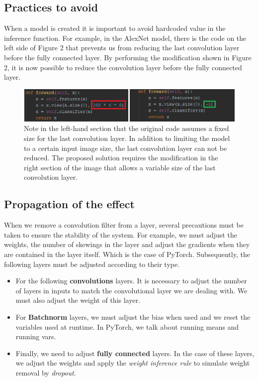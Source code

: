 \documentclass[12pt]{article}
\begin{document}
\subsection{Practices to avoid}

When a model is created it is important to avoid hardcoded value in the inference function. For example, in the AlexNet model, there is the code on the left side of Figure 2 that prevents us from reducing the last convolution layer before the fully connected layer. By performing the modification shown in Figure 2, it is now possible to reduce the convolution layer before the fully connected layer.
\begin{figure}[H]
	\centering
	\includegraphics{fig/mistake}
	\caption{Note in the left-hand section that the original code assumes a fixed size for the last convolution layer. In addition to limiting the model to a certain input image size, the last convolution layer can not be reduced. The proposed solution requires the modification in the right section of the image that allows a variable size of the last convolution layer.}
	\label{fig:mistake}
\end{figure}


\subsection{Propagation of the effect}
When we remove a convolution filter from a layer, several precautions must be taken to ensure the stability of the system. For example, we must adjust the weights, the number of skewings in the layer and adjust the gradients when they are contained in the layer itself. Which is the case of PyTorch.
\newpage
Subsequently, the following layers must be adjusted according to their type.
\begin{itemize}[noitemsep, noitemsep, label={}]
	\item For the following \textbf{convolutions} layers. It is necessary to adjust the number of layers in inputs to match the convolutional layer we are dealing with. We must also adjust the weight of this layer.
	\item For \textbf{Batchnorm} layers, we must adjust the bias when used and we reset the variables used at runtime. In PyTorch, we talk about running means and running vars.
	\item Finally, we need to adjust \textbf{fully connected} layers. In the case of these layers, we adjust the weights and apply the \textit{weight inference rule} \cite{weightinference} to simulate weight removal by \textit{dropout}.
\end{itemize}
\end{document}
